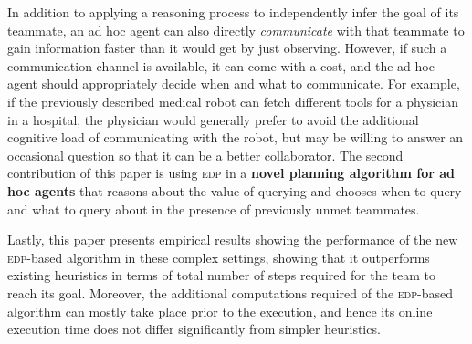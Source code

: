 \documentclass[letterpaper]{article}
\begin{document}
In addition to applying a reasoning process to independently infer the goal of its teammate, an ad hoc agent can also directly \textit{communicate} with that teammate to gain information faster than it would get by just observing. However, if such a communication channel is available, it can come with a cost, and the ad hoc agent should appropriately decide when and what to communicate. %
For example, if the previously described medical robot can fetch different tools for a physician in a hospital, the physician would generally prefer to avoid the additional cognitive load of communicating with the robot, but may be willing to answer an occasional question so that it can be a better collaborator.
The second contribution of this paper is using \textsc{edp} in a
\textbf{novel planning algorithm for ad hoc agents} that reasons about the value of querying and chooses when to query and what to query about in the presence of previously unmet teammates.

Lastly, this paper presents empirical results showing the performance of the new \textsc{edp}-based algorithm in these complex settings, showing that it outperforms existing heuristics in terms of total number of steps required for the team to reach its goal. Moreover, the additional computations required of the \textsc{edp}-based algorithm can mostly take place prior to the execution, and hence its online execution time does not differ significantly from simpler heuristics.
\end{document}
